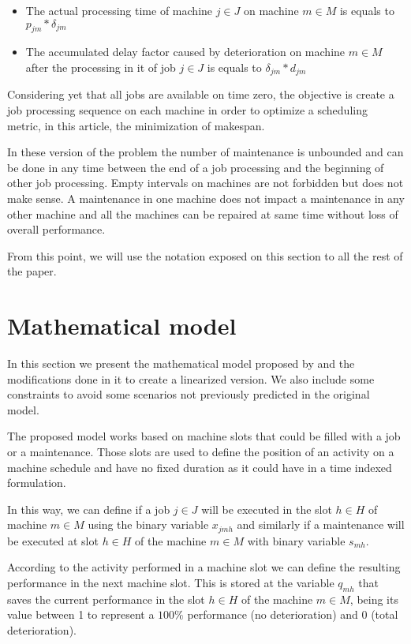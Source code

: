 \documentclass[a4paper,11pt]{article}
\begin{document}
\begin{itemize}
\item{  The actual processing time of machine $j \in J$ on machine $m \in M$ is equals to $p_{jm}*\delta_{jm}$ }

\item{ The accumulated delay factor caused by deterioration on machine $m \in M$ after the processing in it of job $j \in J$ is equals to $\delta_{jm}*d_{jm}$}
\end{itemize}

Considering yet that all jobs are available on time zero, the objective is create a job processing sequence on each machine in order to optimize a scheduling metric, in this article, the minimization of makespan. 

In these version of the problem the number of maintenance is unbounded and can be done in any time between the end of a job processing and the beginning of other job processing. Empty intervals on machines are not forbidden but does not make sense. A maintenance in one machine does not impact a maintenance in any other machine and all the machines can be repaired at same time without loss of overall performance. 

From this point, we will use the notation exposed on this section to all the rest of the paper. 


\section{Mathematical model}

In this section we present the mathematical model proposed by \citep{ruiz2017makespan} and the modifications done in it to create a linearized version. We also include some constraints to avoid some scenarios not previously predicted in the original model.

The proposed model works based on machine slots that could be filled with a job or a maintenance. Those slots are used to define the position of an activity on a machine schedule and have no fixed duration as it could have in a time indexed formulation. 

In this way, we can define if a job $j \in J$ will be executed in the slot $h \in H$ of machine $m \in M$  using the binary variable $x_{jmh}$ and similarly if a maintenance will be executed at slot $h \in H$ of the machine $m \in M$ with binary variable $s_{mh}$.

According to the activity performed in a machine slot we can define the resulting performance in the next machine slot. This is stored at the variable $q_{mh}$ that saves the current performance in the slot $h \in H$ of the machine $m \in M$, being its value between 1 to represent a $100\%$ performance (no deterioration) and 0 (total deterioration).
\end{document}
